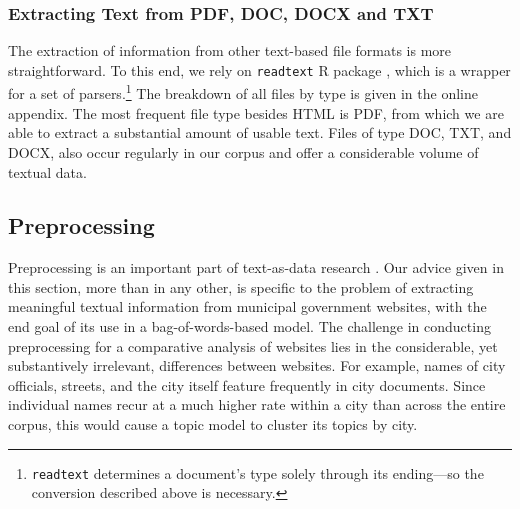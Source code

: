 \documentclass[11pt]{article}
\begin{document}
\subsubsection{Extracting Text from PDF, DOC, DOCX and TXT}
The extraction of information from other text-based file formats is more straightforward. To this end, we rely on \texttt{readtext} R package \citep{readtext}, which is a wrapper for a set of parsers.\footnote{\texttt{readtext} determines a document's type solely through its ending---so the conversion described above is necessary.} The breakdown of all files by type is given in the online appendix. The most frequent file type besides HTML is PDF, from which we are able to extract a substantial amount of usable text. Files of type DOC, TXT, and DOCX, also occur regularly in our corpus and offer a considerable volume of textual data.

\subsection{Preprocessing}
Preprocessing is an important part of text-as-data research \citep{denny2018text}. Our advice given in this section, more than in any other, is specific to the problem of extracting meaningful textual information from municipal government websites, with the end goal of its use in a bag-of-words-based model. The challenge in conducting preprocessing for a comparative analysis of websites lies in the considerable, yet substantively irrelevant, differences between websites. For example, names of city officials, streets, and the city itself feature frequently in city documents. Since individual names recur at a much higher rate within a city than across the entire corpus, this would cause a topic model to cluster its topics by city. 

\end{document}
